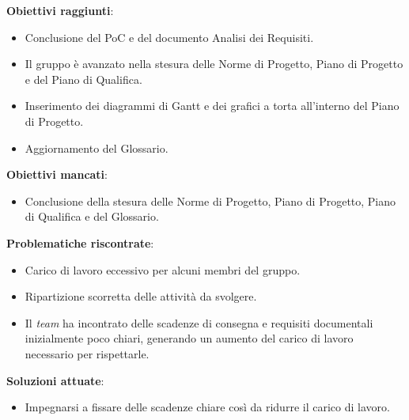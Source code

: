 \textbf{Obiettivi raggiunti}:
\begin{itemize}
	\item Conclusione del PoC e del documento Analisi dei Requisiti.
	\item Il gruppo è avanzato nella stesura delle Norme di Progetto, Piano di Progetto e del Piano di Qualifica.
	\item Inserimento dei diagrammi di Gantt e dei grafici a torta all'interno del Piano di Progetto.
	\item Aggiornamento del Glossario.
\end{itemize}

\textbf{Obiettivi mancati}:
\begin{itemize}
	\item Conclusione della stesura delle Norme di Progetto, Piano di Progetto, Piano di Qualifica e del Glossario.
\end{itemize}

\textbf{Problematiche riscontrate}:
\begin{itemize}
	\item Carico di lavoro eccessivo per alcuni membri del gruppo.
	\item Ripartizione scorretta delle attività da svolgere.
	\item Il \textit{team} ha incontrato delle scadenze di consegna e requisiti documentali inizialmente poco chiari, generando un aumento del carico di lavoro necessario per rispettarle.
\end{itemize}

\textbf{Soluzioni attuate}:
\begin{itemize}
	\item Impegnarsi a fissare delle scadenze chiare così da ridurre il carico di lavoro.
\end{itemize}



